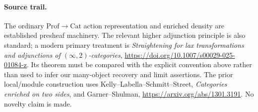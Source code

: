\documentclass{article}
\begin{document}
\paragraph{Source trail.} The ordinary $\mathrm{Prof}\to\mathrm{Cat}$ action representation and enriched density are established presheaf machinery. The relevant higher adjunction principle is also standard; a modern primary treatment is \emph{Straightening for lax transformations and adjunctions of $(\infty,2)$-categories}, \url{https://doi.org/10.1007/s00029-025-01084-z}. Its theorem must be compared with the explicit convention above rather than used to infer our many-object recovery and limit assertions. The prior local/module construction uses Kelly--Labella--Schmitt--Street, \emph{Categories enriched on two sides}, and Garner--Shulman, \url{https://arxiv.org/abs/1301.3191}. No novelty claim is made.
\end{document}
